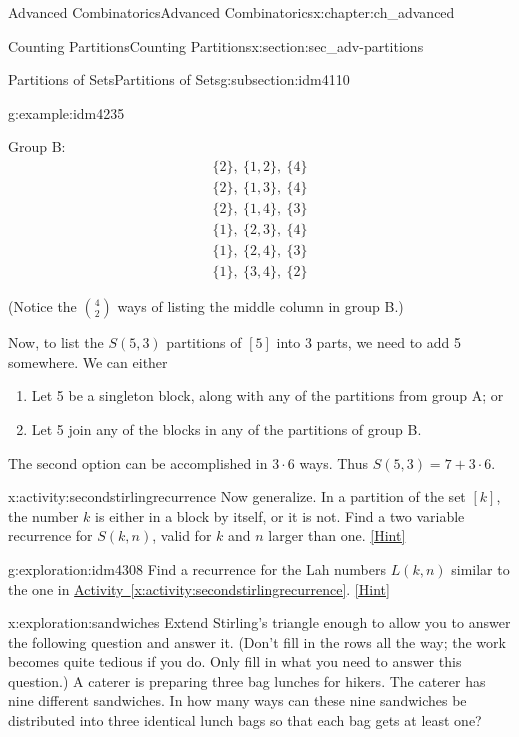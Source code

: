 \documentclass[oneside,10pt,]{book}
\numberwithin{equation}{chapter}
\begin{document}
\begin{chapterptx}{Advanced Combinatorics}{}{Advanced Combinatorics}{}{}{x:chapter:ch_advanced}
\begin{sectionptx}{Counting Partitions}{}{Counting Partitions}{}{}{x:section:sec_adv-partitions}
\begin{subsectionptx}{Partitions of Sets}{}{Partitions of Sets}{}{}{g:subsection:idm4110}
\begin{example}{}{g:example:idm4235}
\begin{sidebyside}{2}{0.05}{0.05}{0.1}
\begin{sbspanel}{0.3}
\par
Group B:%
\begin{gather*}
\{2\}, ~ \{1,2\}, ~ \{4\}\\
\{2\}, ~ \{1,3\}, ~ \{4\}\\
\{2\}, ~ \{1,4\}, ~ \{3\}\\
\{1\}, ~ \{2,3\}, ~ \{4\}\\
\{1\}, ~ \{2,4\}, ~ \{3\}\\
\{1\}, ~ \{3,4\}, ~ \{2\}
\end{gather*}
%
\end{sbspanel}%
\end{sidebyside}%
\par
(Notice the \(\binom{4}{2}\) ways of listing the middle column in group B.)%
\par
Now, to list the \(S(5,3)\) partitions of \([5]\) into \(3\) parts, we need to add 5 somewhere.  We can either%
\begin{enumerate}[label=\alph*.]
\item{}Let 5 be a singleton block, along with any of the partitions from group A; or%
\item{}Let 5 join any of the blocks in any of the partitions of group B.%
\end{enumerate}
The second option can be accomplished in \(3\cdot 6\) ways.  Thus \(S(5,3) = 7 + 3\cdot 6\).%
\end{example}
\begin{activity}{}{x:activity:secondstirlingrecurrence}%
Now generalize.  In a partition of the set \([k]\), the number \(k\) is either in a block by itself, or it is not.  Find a two variable recurrence for \(S(k,n)\), valid for \(k\) and \(n\) larger than one.%
\space\hspace*{0pt}\hfill{\tiny\hyperlink{g:hint:idm4278-back}{[Hint]}}\end{activity}
\begin{exploration}{}{g:exploration:idm4308}%
Find a recurrence for the Lah numbers \(L(k,n)\) similar to the one in \hyperref[x:activity:secondstirlingrecurrence]{Activity~\ref{x:activity:secondstirlingrecurrence}}.%
\space\hspace*{0pt}\hfill{\tiny\hyperlink{g:hint:idm4313-back}{[Hint]}}\end{exploration}
\begin{exploration}{}{x:exploration:sandwiches}%
Extend Stirling's triangle enough to allow you to answer the following question and answer it. (Don't fill in the rows all the way; the work becomes quite tedious if you do. Only fill in what you need to answer this question.) A caterer is preparing three bag lunches for hikers. The caterer has nine different sandwiches. In how many ways can these nine sandwiches be distributed into three identical lunch bags so that each bag gets at least one?%

\end{exploration}
\end{subsectionptx}
\end{sectionptx}
\end{chapterptx}
\end{document}
